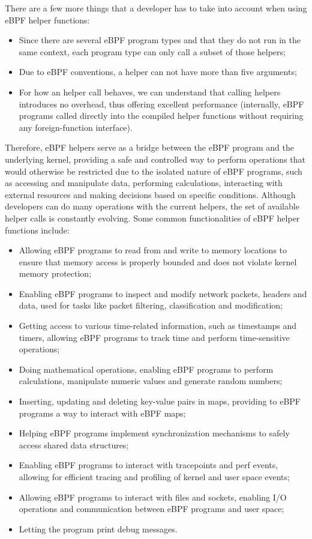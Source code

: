 There are a few more things that a developer has to take into account when using eBPF helper functions:

\begin{itemize}
	\item 
		Since there are several eBPF program types and that they do not run in the same context, each program type can only call a subset of those helpers;
	\item 
		Due to eBPF conventions, a helper can not have more than five arguments;
	\item 
		For how an helper call behaves, we can understand that calling helpers introduces no overhead, thus offering excellent performance (internally, eBPF programs called directly into the compiled helper functions without requiring any foreign-function interface).
\end{itemize}

Therefore, eBPF helpers serve as a bridge between the eBPF program and the underlying kernel, providing a safe and controlled way to perform operations that would otherwise be restricted due to the isolated nature of eBPF programs, such as accessing and manipulate data, performing calculations, interacting with external resources and making decisions based on specific conditions.
Although developers can do many operations with the current helpers, the set of available helper calls is constantly evolving.
Some common functionalities of eBPF helper functions include:

\begin{itemize}
	\item 
		Allowing eBPF programs to read from and write to memory locations to ensure that memory access is properly bounded and does not violate kernel memory protection;
	\item 
		Enabling eBPF programs to inspect and modify network packets, headers and data, used for tasks like packet filtering, classification and modification;
	\item 
		Getting access to various time-related information, such as timestamps and timers, allowing eBPF programs to track time and perform time-sensitive operations;
	\item 
		Doing mathematical operations, enabling eBPF programs to perform calculations, manipulate numeric values and generate random numbers;
	\item 
		Inserting, updating and deleting key-value pairs in maps, providing to eBPF programs a way to interact with eBPF maps;
	\item 
		Helping eBPF programs implement synchronization mechanisms to safely access shared data structures;
	\item 
		Enabling eBPF programs to interact with tracepoints and perf events, allowing for efficient tracing and profiling of kernel and user space events;
	\item 
		Allowing eBPF programs to interact with files and sockets, enabling I/O operations and communication between eBPF programs and user space;
	\item 
		Letting the program print debug messages.
\end{itemize}

